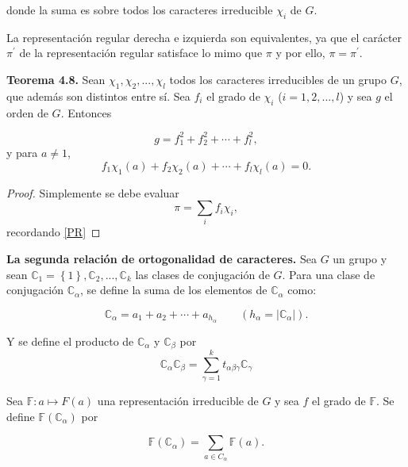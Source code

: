 \documentclass[12pt]{book}
\theoremstyle{definition}
\newcounter{in}
\begin{document}
donde la suma es sobre todos los caracteres irreducible $\chi_{i}$ de $G$.

La representación regular derecha e izquierda son equivalentes, ya que
el carácter $\pi^{'}$ de la representación regular satisface lo mimo
que $\pi$ y por ello, $\pi = \pi^{'}$.

\textbf{Teorema 4.8.} Sean $\chi_{1}, \chi_{2},...,\chi_{l} $ todos
los caracteres irreducibles de un grupo $G$, que además son distintos
entre sí. Sea $f_{i}$ el grado de $\chi_{i}$ ($i=1, 2,..., l$) y sea
$g$ el orden de $G$. Entonces

\begin{equation*}
  g=f_{1}^{2}+f_{2}^{2}+ \cdots + f_{l}^{2},
\end{equation*}
y para $a \neq 1$,
\begin{equation*}
  f_{1} \chi_{1}(a)+f_{2} \chi_{2}(a)+ \cdots + f_{l} \chi_{l}(a) = 0.
\end{equation*}

\begin{proof}
  Simplemente se debe evaluar
  \begin{equation*}
   \pi=\sum_{i} f_{i} \chi_{i},
 \end{equation*}
 recordando \ref{PR}
\end{proof}

\textbf{La segunda relación de ortogonalidad de caracteres.} Sea $G$
un grupo y sean
$\mathbb{C}_{1}=\left\{1 \right\}, \mathbb{C}_{2},...,\mathbb{C}_{k}$
las clases de conjugación de $G$. Para una clase de conjugación
$\mathbb{C}_{\alpha}$, se define la suma de los elementos de
$\mathbb{C}_{\alpha}$ como:

\begin{equation*}
  \mathbb{C}_{\alpha}=a_{1}+a_{2}+ \cdots + a_{h_{\alpha}} \qquad (h_{\alpha}=|\mathbb{C}_{\alpha}|).
\end{equation*}

Y se define el producto de $\mathbb{C}_{\alpha}$ y $\mathbb{C}_{\beta}$ por
\begin{equation*} \label{MULT}
  \mathbb{C}_{\alpha} \mathbb{C}_{\beta} = \sum_{\gamma=1}^{k} t_{\alpha \beta \gamma} \mathbb{C}_{\gamma}
\end{equation*}

Sea $\mathbb{F} \colon a \mapsto F(a)$ una representación irreducible
de $G$ y sea $f$ el grado de $\mathbb{F}$. Se define
$\mathbb{F} (\mathbb{C}_{\alpha})$ por

\begin{equation*}
  \mathbb{F} (\mathbb{C}_{\alpha}) = \sum_{a \in C_{\alpha}} \mathbb{F}(a).
\end{equation*}
\end{document}

